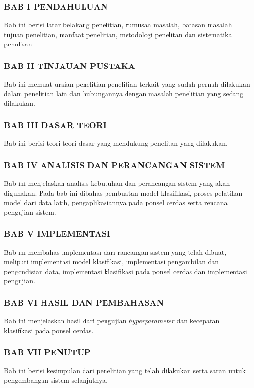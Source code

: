 \subsubsection{BAB I PENDAHULUAN}
Bab ini berisi latar belakang penelitian, rumusan masalah, batasan masalah, tujuan penelitian, manfaat penelitian, metodologi penelitan dan sistematika penulisan.

\subsubsection{BAB II TINJAUAN PUSTAKA}
Bab ini memuat uraian penelitian-penelitian terkait yang sudah pernah dilakukan dalam penelitian lain dan hubungannya dengan masalah penelitian yang sedang dilakukan.

\subsubsection{BAB III DASAR TEORI}
Bab ini berisi teori-teori dasar yang mendukung penelitan yang dilakukan.

\subsubsection{BAB IV ANALISIS DAN PERANCANGAN SISTEM}
Bab ini menjelaskan analisis kebutuhan dan perancangan sistem yang akan digunakan. Pada bab ini dibahas pembuatan model klasifikasi, proses pelatihan model dari data latih, pengaplikasiannya pada ponsel cerdas serta rencana pengujian sistem.

\subsubsection{BAB V IMPLEMENTASI}
Bab ini membahas implementasi dari rancangan sistem yang telah dibuat, meliputi implementasi model klasifikasi, implementasi pengambilan dan pengondisian data, implementasi klasifikasi pada ponsel cerdas dan implementasi pengujian.

\subsubsection{BAB VI HASIL DAN PEMBAHASAN}
Bab ini menjelaskan hasil dari pengujian \textit{hyperparameter} dan kecepatan klasifikasi pada ponsel cerdas.

\subsubsection{BAB VII PENUTUP}
Bab ini berisi kesimpulan dari penelitian yang telah dilakukan serta saran untuk pengembangan sistem selanjutnya.

